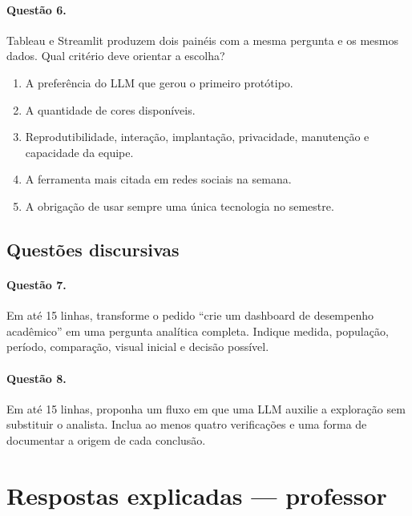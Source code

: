 \paragraph{Questão 6.} Tableau e Streamlit produzem dois painéis com a mesma pergunta e os mesmos dados. Qual critério deve orientar a escolha?

\begin{enumerate}[label=\Alph*)]
\item A preferência do LLM que gerou o primeiro protótipo.
\item A quantidade de cores disponíveis.
\item Reprodutibilidade, interação, implantação, privacidade, manutenção e capacidade da equipe.
\item A ferramenta mais citada em redes sociais na semana.
\item A obrigação de usar sempre uma única tecnologia no semestre.
\end{enumerate}

\subsection*{Questões discursivas}

\paragraph{Questão 7.} Em até 15 linhas, transforme o pedido ``crie um dashboard de desempenho acadêmico'' em uma pergunta analítica completa. Indique medida, população, período, comparação, visual inicial e decisão possível.

\paragraph{Questão 8.} Em até 15 linhas, proponha um fluxo em que uma LLM auxilie a exploração sem substituir o analista. Inclua ao menos quatro verificações e uma forma de documentar a origem de cada conclusão.

\section*{Respostas explicadas --- professor}

